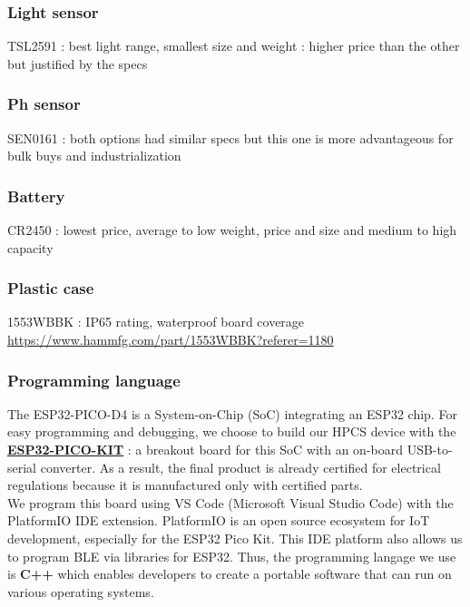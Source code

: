 \subsubsection{Light sensor}
TSL2591 : best light range, smallest size and weight : higher price than the other but justified by the specs
\subsubsection{Ph sensor}
SEN0161 : both options had similar specs but this one is more advantageous for bulk buys and industrialization
\subsubsection{Battery}
CR2450 : lowest price, average to low weight, price and size and medium to high capacity
\subsubsection{Plastic case}
1553WBBK : IP65 rating, waterproof board coverage 
\url{https://www.hammfg.com/part/1553WBBK?referer=1180}\\

\subsubsection*{Programming language}
The ESP32-PICO-D4 is a System-on-Chip (SoC) integrating an ESP32 chip.
For easy programming and debugging, we choose to build our HPCS device with the \textbf{\href{https://www.elektor.com/esp32-pico-kit-v4}{ESP32-PICO-KIT}} : a breakout board for this SoC with an on-board USB-to-serial converter. As a result, the final product is already certified for electrical regulations because it is manufactured only with certified parts.\\
We program this board using VS Code (Microsoft Visual Studio Code) with the PlatformIO IDE extension.
PlatformIO is an open source ecosystem for IoT development, especially for the ESP32 Pico Kit\cite{b8}. This IDE platform also allows us to program BLE via libraries for ESP32. 
Thus, the programming langage we use is \textbf{C++} which enables developers to create a portable software that can run on various operating systems.

